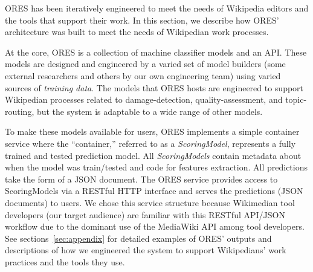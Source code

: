 
ORES has been iteratively engineered to meet the needs of Wikipedia editors and the tools that support their work.  In this section, we describe how ORES' architecture was built to meet the needs of Wikipedian work processes.

At the core, ORES is a collection of machine classifier models and an API.  These models are designed and engineered by a varied set of model builders (some external researchers and others by our own engineering team) using varied sources of \emph{training data}.  The models that ORES hosts are engineered to support Wikipedian processes related to damage-detection, quality-assessment, and topic-routing, but the system is adaptable to a wide range of other models.

To make these models available for users, ORES implements a simple container service where the ``container,'' referred to as a \emph{ScoringModel}, represents a fully trained and tested prediction model.  All \emph{ScoringModels} contain metadata about when the model was train/tested and code for features extraction.  All predictions take the form of a JSON document.  The ORES service provides access to ScoringModels via a RESTful HTTP interface and serves the predictions (JSON documents) to users.  We chose this service structure because Wikimedian tool developers (our target audience) are familiar with this RESTful API/JSON workflow due to the dominant use of the MediaWiki API among tool developers.  See sections~\ref{sec:appendix} for detailed examples of ORES' outputs and descriptions of how we engineered the system to support Wikipedians' work practices and the tools they use. 
